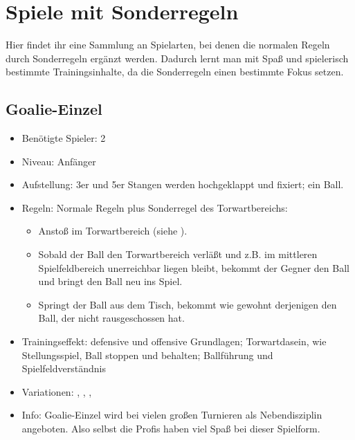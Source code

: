 \section{Spiele mit Sonderregeln}
\label{spielformen:sonderregeln}

Hier findet ihr eine Sammlung an Spielarten, bei denen die normalen Regeln durch Sonderregeln ergänzt werden. 
Dadurch lernt man mit Spaß und spielerisch bestimmte Trainingsinhalte, da die Sonderregeln einen bestimmte Fokus setzen. 

\subsection{Goalie-Einzel}
\label{spielformen:sonderregeln:goalie}

\begin{itemize}
\item Benötigte Spieler: 2
\item Niveau: Anfänger
\item Aufstellung: 3er und 5er Stangen werden hochgeklappt und fixiert; ein Ball.
\item Regeln: Normale Regeln plus Sonderregel des Torwartbereichs: 
  \begin{itemize}
  \item Anstoß im Torwartbereich (siehe ).
  \item Sobald der Ball den Torwartbereich verläßt und z.B. im mittleren Spielfeldbereich unerreichbar liegen bleibt, bekommt der Gegner den Ball und bringt den Ball neu ins Spiel.
  \item Springt der Ball aus dem Tisch, bekommt wie gewohnt derjenigen den Ball, der nicht rausgeschossen hat. 
  \end{itemize}
\item Trainingseffekt: defensive und offensive Grundlagen; Torwartdasein, wie Stellungsspiel, Ball stoppen und behalten; Ballführung und Spielfeldverständnis
\item Variationen: , , , 
\item Info: Goalie-Einzel wird bei vielen großen Turnieren als Nebendisziplin angeboten. Also selbst die Profis haben viel Spaß bei dieser Spielform.
\end{itemize}


